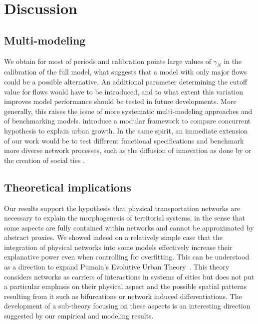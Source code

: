 \documentclass{article}
\begin{document}
\section*{Discussion}


\subsection*{Multi-modeling}

We obtain for most of periods and calibration points large values of $\gamma_N$ in the calibration of the full model, what suggests that a model with only major flows could be a possible alternative. An additional parameter determining the cutoff value for flows would have to be introduced, and to what extent this variation improves model performance should be tested in future developments. More generally, this raises the issue of more systematic multi-modeling approaches and of benchmarking models. \cite{cottineau2015modular} introduce a modular framework to compare concurrent hypothesis to explain urban growth. In the same spirit, an immediate extension of our work would be to test different functional specifications and benchmark more diverse network processes, such as the diffusion of innovation as done by \cite{favaro2011gibrat} or the creation of social ties \citep{frasco2014spatially}.

\subsection*{Theoretical implications}


Our results support the hypothesis that physical transportation networks are necessary to explain the morphogenesis of territorial systems, in the sense that some aspects are fully contained within networks and cannot be approximated by abstract proxies. We showed indeed on a relatively simple case that the integration of physical networks into some models effectively increase their explanative power even when controlling for overfitting. This can be understood as a direction to expand Pumain's Evolutive Urban Theory~\citep{pumain1997pour}. This theory considers networks as carriers of interactions in systems of cities but does not put a particular emphasis on their physical aspect and the possible spatial patterns resulting from it such as bifurcations or network induced differentiations. The development of a sub-theory focusing on these aspects is an interesting direction suggested by our empirical and modeling results.
\end{document}

